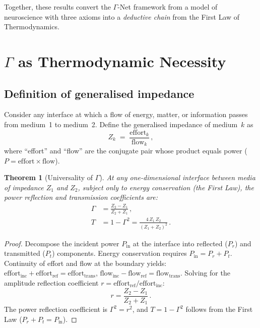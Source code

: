 \documentclass[aps,pre,twocolumn,superscriptaddress,floatfix]{revtex4-2}
\newtheorem{theorem}{Theorem}
\begin{document}
Together, these results convert the $\Gamma$-Net framework
from a model of neuroscience with three axioms into a
\emph{deductive chain} from the First Law of Thermodynamics.


\section{$\Gamma$ as Thermodynamic Necessity}
\label{sec:necessity}

\subsection{Definition of generalised impedance}

Consider any interface at which a flow of energy,
matter, or information passes from medium~1 to medium~2.
Define the generalised impedance of medium~$k$ as
\begin{equation}
  Z_k \;=\; \frac{\text{effort}_k}{\text{flow}_k}\,,
  \label{eq:impedance-def}
\end{equation}
where ``effort'' and ``flow'' are the conjugate pair
whose product equals power ($P = \text{effort} \times
\text{flow}$).

\begin{theorem}[Universality of $\Gamma$]
\label{thm:gamma}
At any one-dimensional interface between media of
impedance $Z_1$ and $Z_2$, subject only to energy
conservation (the First Law), the power reflection
and transmission coefficients are:
\begin{align}
  \Gamma &= \frac{Z_2 - Z_1}{Z_2 + Z_1}\,,
  \label{eq:gamma-def}\\
  T &= 1 - \Gamma^2
    = \frac{4\,Z_1\,Z_2}{(Z_1+Z_2)^2}\,.
  \label{eq:T-def}
\end{align}
\end{theorem}

\begin{proof}
Decompose the incident power $P_{\text{in}}$ at the
interface into reflected ($P_r$) and transmitted ($P_t$)
components.  Energy conservation requires
$P_{\text{in}} = P_r + P_t$.
Continuity of effort and flow at the boundary yields:
$\text{effort}_{\text{inc}} + \text{effort}_{\text{ref}}
= \text{effort}_{\text{trans}}$,
$\text{flow}_{\text{inc}} - \text{flow}_{\text{ref}}
= \text{flow}_{\text{trans}}$.
Solving for the amplitude reflection coefficient
$r = \text{effort}_{\text{ref}} /
\text{effort}_{\text{inc}}$:
\[
  r = \frac{Z_2 - Z_1}{Z_2 + Z_1}\,.
\]
The power reflection coefficient is $\Gamma^2 = r^2$,
and $T = 1 - \Gamma^2$ follows from the First Law
($P_r + P_t = P_{\text{in}}$).
\end{proof}
\end{document}
